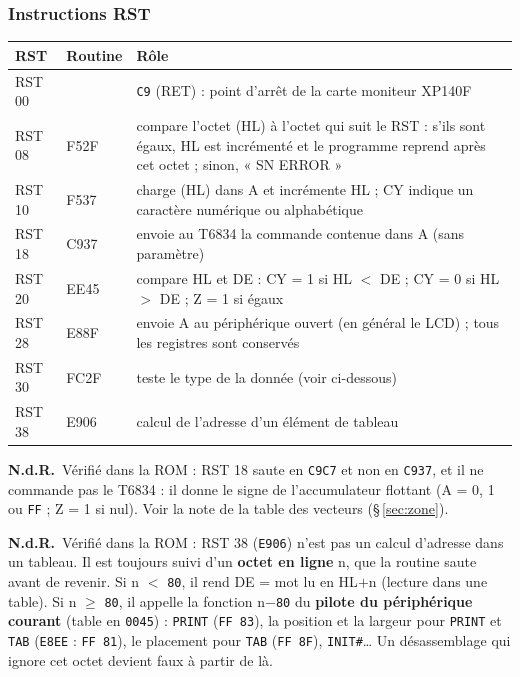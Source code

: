 \documentclass[a4paper,10pt]{article}
\newcommand{\hex}[1]{\texttt{#1}}
\newcommand{\nota}[1]{\textcolor{red!60!black}{\small\textbf{N.d.R.}~#1}}
\begin{document}
\subsubsection*{Instructions RST}
\begin{center}\small
\begin{tabular}{@{}>{\ttfamily}l>{\ttfamily}l>{\raggedright\arraybackslash}p{11.5cm}@{}}
\toprule
\normalfont RST & \normalfont Routine & Rôle \\
\midrule
RST 00 & 0000 & \texttt{C9} (RET) : point d'arrêt de la carte moniteur XP140F \\
RST 08 & F52F & compare l'octet (HL) à l'octet qui suit le RST : s'ils sont égaux, HL est incrémenté et le programme reprend après cet octet ; sinon, « SN ERROR » \\
RST 10 & F537 & charge (HL) dans A et incrémente HL ; CY indique un caractère numérique ou alphabétique \\
RST 18 & C937 & envoie au T6834 la commande contenue dans A (sans paramètre) \\
RST 20 & EE45 & compare HL et DE : CY = 1 si HL $<$ DE ; CY = 0 si HL $>$ DE ; Z = 1 si égaux \\
RST 28 & E88F & envoie A au périphérique ouvert (en général le LCD) ; tous les registres sont conservés \\
RST 30 & FC2F & teste le type de la donnée (voir ci-dessous) \\
RST 38 & E906 & calcul de l'adresse d'un élément de tableau \\
\bottomrule
\end{tabular}
\end{center}
\nota{Vérifié dans la ROM : RST 18 saute en \hex{C9C7} et non en
\hex{C937}, et il ne commande pas le T6834 : il donne le signe de
l'accumulateur flottant (A = 0, 1 ou \hex{FF} ; Z = 1 si nul). Voir la note
de la table des vecteurs (§\,\ref{sec:zone}).}

\nota{Vérifié dans la ROM : RST 38 (\hex{E906}) n'est pas un calcul d'adresse
dans un tableau. Il est toujours suivi d'un \textbf{octet en ligne} n, que la
routine saute avant de revenir. Si n $<$ \hex{80}, il rend DE = mot lu en
HL$+$n (lecture dans une table). Si n $\ge$ \hex{80}, il appelle la
fonction n$-$\hex{80} du \textbf{pilote du périphérique courant} (table en
\hex{0045}) : \texttt{PRINT} (\texttt{FF 83}), la position et la largeur pour
\texttt{PRINT} et \texttt{TAB} (\hex{E8EE} : \texttt{FF 81}), le placement
pour \texttt{TAB} (\texttt{FF 8F}), \texttt{INIT\#}\dots{} Un désassemblage
qui ignore cet octet devient faux à partir de là.}
\end{document}

